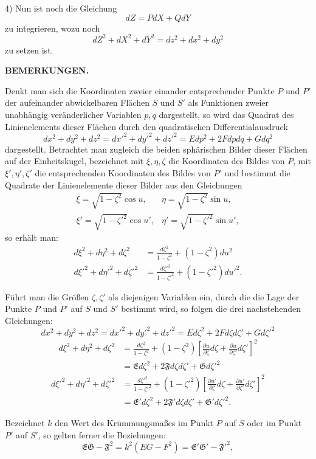 \par
4) Nun ist noch die Gleichung
\[
dZ=PdX+QdY
\]
\noindent zu integrieren, wozu noch
\[
dZ^2+dX^2+dY^2=dz^2+dx^2+dy^2
\]
\noindent zu setzen ist.

\begin{center}\textbf{BEMERKUNGEN.}\end{center}
\noindent\hspace*{1.2em}Denkt man sich die Koordinaten zweier einander entsprechender Punkte $P$ und $P'$ der aufeinander abwickelbaren Flächen $S$ und $S'$ als Funktionen zweier unabhängig veränderlicher Variablen $p,q$ dargestellt, so wird das Quadrat des Linienelements dieser Flächen durch den quadratischen Differentialausdruck
\[
dx^2+dy^2+dz^2=dx'^2+dy'^2+dz'^2=Edp^2+2Fdpdq+Gdq^2
\]
\noindent dargestellt. Betrachtet man zugleich die beiden sphärischen Bilder dieser Flächen auf der Einheitskugel, bezeichnet mit $\xi,\eta,\zeta$ die Koordinaten des Bildes von $P$, mit $\xi',\eta',\zeta'$ die entsprechenden Koordinaten des Bildes von $P'$ und bestimmt die Quadrate der Linienelemente dieser Bilder aus den Gleichungen
\[
\begin{array}{ll}
\xi=\sqrt{1-\zeta^2}\cos u,&\eta=\sqrt{1-\zeta^2}\sin u,\\[4pt]
\xi'=\sqrt{1-\zeta'^2}\cos u',&\eta'=\sqrt{1-\zeta'^2}\sin u',
\end{array}
\]
\noindent so erhält man:
\[
\begin{aligned}
d\xi^2+d\eta^2+d\zeta^2&=\frac{d\zeta^2}{1-\zeta^2}+(1-\zeta^2)du^2\\[5pt]
d\xi'^2+d\eta'^2+d\zeta'^2&=\frac{d\zeta'^2}{1-\zeta'^2}+(1-\zeta'^2)du'^2.
\end{aligned}
\]

\noindent Führt man die Größen $\zeta,\zeta'$ als diejenigen Variablen ein, durch die die Lage der Punkte $P$ und $P'$ auf $S$ und $S'$ bestimmt wird, so folgen die drei nachstehenden Gleichungen:
\[
dx^2+dy^2+dz^2=dx'^2+dy'^2+dz'^2=Ed\zeta^2+2Fd\zeta d\zeta'+Gd\zeta'^2
\]
\[
\begin{aligned}
d\xi^2+d\eta^2+d\zeta^2
&=\frac{d\zeta^2}{1-\zeta^2}+(1-\zeta^2)\left[\frac{\partial u}{\partial\zeta}d\zeta+\frac{\partial u}{\partial\zeta'}d\zeta'\right]^2\\
&=\mathfrak{E}d\zeta^2+2\mathfrak{F}d\zeta d\zeta'+\mathfrak{G}d\zeta'^2
\end{aligned}
\]
\[
\begin{aligned}
d\xi'^2+d\eta'^2+d\zeta'^2
&=\frac{d\zeta'^2}{1-\zeta'^2}+(1-\zeta'^2)\left[\frac{\partial u'}{\partial\zeta}d\zeta+\frac{\partial u'}{\partial\zeta'}d\zeta'\right]^2\\
&=\mathfrak{E}'d\zeta^2+2\mathfrak{F}'d\zeta d\zeta'+\mathfrak{G}'d\zeta'^2.
\end{aligned}
\]

\noindent Bezeichnet $k$ den Wert des Krümmungsmaßes im Punkt $P$ auf $S$ oder im Punkt $P'$ auf $S'$, so gelten ferner die Beziehungen:
\[
\mathfrak{E}\mathfrak{G}-\mathfrak{F}^2=k^2(EG-F^2)=\mathfrak{E}'\mathfrak{G}'-\mathfrak{F}'^2,
\]

